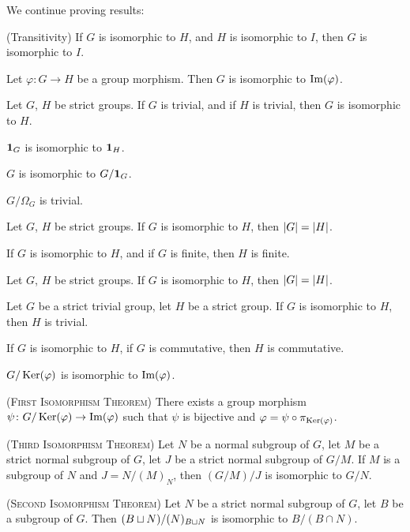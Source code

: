 \documentclass{article}
\begin{document}
We continue proving results:
\begin{thm}
\item\label{group6:67} (Transitivity) If $G$ is isomorphic to $H$, and
  $H$ is isomorphic to $I$, then $G$ is isomorphic to $I$.
\item\label{group6:68} Let $\varphi\colon G\to H$ be a group morphism.
  Then $G$ is isomorphic to $\operatorname{Im}(\varphi)$.
\item\label{group6:69} Let $G$, $H$ be strict groups. If $G$ is trivial,
  and if $H$ is trivial, then $G$ is isomorphic to $H$.
\item\label{group6:70} $\mathbf{1}_{G}$ is isomorphic to $\mathbf{1}_{H}$.
\item\label{group6:71} $G$ is isomorphic to $G/\mathbf{1}_{G}$.
\item\label{group6:72} $G/\Omega_{G}$ is trivial.
\item\label{group6:73} Let $G$, $H$ be strict groups.
  If $G$ is isomorphic to $H$, then $|G|=|H|$.
\item\label{group6:74} If $G$ is isomorphic to $H$, and if $G$ is
  finite, then $H$ is finite.
\item\label{group6:75} Let $G$, $H$ be strict groups.
  If $G$ is isomorphic to $H$, then $|G|=|H|$.
\item\label{group6:76} Let $G$ be a strict trivial group, let $H$ be a
  strict group. If $G$ is isomorphic to $H$, then $H$ is trivial.
\item\label{group6:77} If $G$ is isomorphic to $H$, if $G$ is
  commutative, then $H$ is commutative.
\item\label{group6:78} $G/\operatorname{Ker}(\varphi)$ is isomorphic to $\operatorname{Im}(\varphi)$.
\item\label{group6:79} (\textsc{First Isomorphism Theorem}) There exists
  a group morphism $\psi\colon G/\operatorname{Ker}(\varphi)\to\operatorname{Im}(\varphi)$
  such that $\psi$ is bijective and $\varphi=\psi\circ\pi_{\operatorname{Ker}(\varphi)}$.
\item\label{group6:80} (\textsc{Third Isomorphism Theorem}) Let $N$ be a
  normal subgroup of $G$, let $M$ be a
  strict normal subgroup of $G$, let $J$ be a strict normal subgroup of $G/M$.
  If $M$ is a subgroup of $N$ and $J=N/(M)_{N}$, then $(G/M)/J$ is
  isomorphic to $G/N$.
\item\label{group6:81} (\textsc{Second Isomorphism Theorem}) Let $N$ be
  a strict normal subgroup of $G$, let $B$ be a subgroup of $G$.
  Then $(B\sqcup N)/(N)_{B\sqcup N}$ is isomorphic to $B/(B\cap N)$. 
\end{thm}
\end{document}

